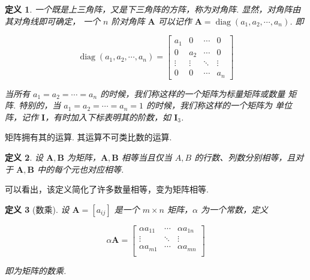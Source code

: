\documentclass[a4paper]{article}
\newtheorem{definition}{定义}[section]
\begin{document}
\begin{definition}
    一个既是上三角阵，又是下三角阵的方阵，称为对角阵. 显然，对角阵由其对角线即可确定，
    一个 $n$ 阶对角阵 $\boldsymbol A$ 可以记作 $\boldsymbol A=\operatorname{diag}
        (a_1,a_2,\cdots,a_n)$. 即

    $$
        \operatorname{diag}(a_1,a_2,\cdots,a_n)=\begin{bmatrix}
            a_1    & 0      & \cdots & 0      \\
            0      & a_2    & \cdots & 0      \\
            \vdots & \vdots & \ddots & \vdots \\
            0      & 0      & \cdots & a_n
        \end{bmatrix}
    $$

    当所有 $a_1=a_2=\cdots=a_n$ 的时候，我们称这样的一个矩阵为标量矩阵或数量
    矩阵. 特别的，当 $a_1=a_2=\cdots=a_n=1$ 的时候，我们称这样的一个矩阵为
    单位阵，记作 $\boldsymbol I$，有时加入下标表明其的阶数，如 $\boldsymbol I_3$.
\end{definition}

矩阵拥有其的运算. 其运算不可类比数的运算.

\begin{definition}
    设 $\boldsymbol A,\boldsymbol B$ 为矩阵，$\boldsymbol A,\boldsymbol B$
    相等当且仅当 $A,B$ 的行数、列数分别相等，且对于 $\boldsymbol A,\boldsymbol B$
    中的每个元也对应相等.
\end{definition}

可以看出，该定义简化了许多数量相等，变为矩阵相等.

\begin{definition}[数乘]
    设 $\boldsymbol A=[a_{ij}]$ 是一个 $m\times n$ 矩阵，$\alpha$ 为一个常数，定义

    \begin{equation*}
        \alpha\boldsymbol A=\begin{bmatrix}
            \alpha a_{11} & \cdots & \alpha a_{1n} \\
            \vdots        & \ddots & \vdots        \\
            \alpha a_{m1} & \cdots & \alpha a_{mn} \\
        \end{bmatrix}
    \end{equation*}

    即为矩阵的数乘.
\end{definition}
\end{document}
